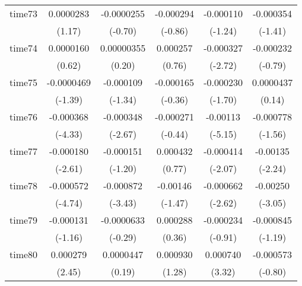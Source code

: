 \begin{table}[htbp]
\begin{tabular}{l*{5}{c}}
time73      &   0.0000283         &  -0.0000255         &   -0.000294         &   -0.000110         &   -0.000354         \\
            &      (1.17)         &     (-0.70)         &     (-0.86)         &     (-1.24)         &     (-1.41)         \\
time74      &   0.0000160         &  0.00000355         &    0.000257         &   -0.000327\sym{**} &   -0.000232         \\
            &      (0.62)         &      (0.20)         &      (0.76)         &     (-2.72)         &     (-0.79)         \\
time75      &  -0.0000469         &   -0.000109         &   -0.000165         &   -0.000230         &   0.0000437         \\
            &     (-1.39)         &     (-1.34)         &     (-0.36)         &     (-1.70)         &      (0.14)         \\
time76      &   -0.000368\sym{***}&   -0.000348\sym{**} &   -0.000271         &    -0.00113\sym{***}&   -0.000778         \\
            &     (-4.33)         &     (-2.67)         &     (-0.44)         &     (-5.15)         &     (-1.56)         \\
time77      &   -0.000180\sym{**} &   -0.000151         &    0.000432         &   -0.000414\sym{*}  &    -0.00135\sym{*}  \\
            &     (-2.61)         &     (-1.20)         &      (0.77)         &     (-2.07)         &     (-2.24)         \\
time78      &   -0.000572\sym{***}&   -0.000872\sym{***}&    -0.00146         &   -0.000662\sym{**} &    -0.00250\sym{**} \\
            &     (-4.74)         &     (-3.43)         &     (-1.47)         &     (-2.62)         &     (-3.05)         \\
time79      &   -0.000131         &  -0.0000633         &    0.000288         &   -0.000234         &   -0.000845         \\
            &     (-1.16)         &     (-0.29)         &      (0.36)         &     (-0.91)         &     (-1.19)         \\
time80      &    0.000279\sym{*}  &   0.0000447         &    0.000930         &    0.000740\sym{***}&   -0.000573         \\
            &      (2.45)         &      (0.19)         &      (1.28)         &      (3.32)         &     (-0.80)         \\

\end{tabular}
\end{table}
